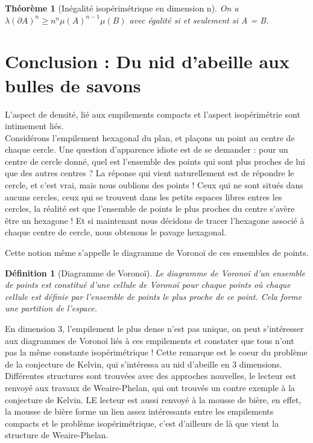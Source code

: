 \documentclass{book}
\newtheorem{theorem}{Théorème}
\newtheorem{definition}{Définition}
\begin{document}
\begin{tcolorbox}[colback=green!6]
\begin{theorem}[Inégalité isopérimétrique en dimension n]
On a $\lambda (\partial A)^n \geq n^n \mu (A)^{n-1} \mu (B)$ avec égalité si et seulement si A = B.
\end{theorem}
\end{tcolorbox}
\newpage

\section{Conclusion : Du nid d'abeille aux bulles de savons}

L'aspect de densité, lié aux empilements compacts et l'aspect isopérimétrie sont intimement liés. \\
Considérons l'empilement hexagonal du plan, et plaçons un point au centre de chaque cercle. Une question d'apparence idiote est de se demander : pour un centre de cercle donné, quel est l'ensemble des points qui sont plus proches de lui que des autres centres ? La réponse qui vient naturellement est de répondre le cercle, et c'est vrai, mais nous oublions des points ! Ceux qui ne sont situés dans aucuns cercles, ceux qui se trouvent dans les petits espaces libres entres les cercles, la réalité est que l'ensemble de points le plus proches du centre s'avère être un hexagone ! Et si maintenant nous décidons de tracer l'hexagone associé à chaque centre de cercle, nous obtenons le pavage hexagonal.

Cette notion même s'appelle le diagramme de Voronoï de ces ensembles de points.

\begin{definition}[Diagramme de Voronoï]

Le diagramme de Voronoï d'un ensemble de points est constitué d'une cellule de Voronoï pour chaque points où chaque cellule est définie par l'ensemble de points le plus proche de ce point. Cela forme une partition de l'espace.
\end{definition}

En dimension 3, l'empilement le plus dense n'est pas unique, on peut s'intéresser aux diagrammes de Voronoï liés à ces empilements et constater que tous n'ont pas la même constante isopérimétrique ! Cette remarque est le coeur du problème de la conjecture de Kelvin, qui s'intéressa au nid d'abeille en 3 dimensions. Différentes structures sont trouvées avec des approches nouvelles, le lecteur est renvoyé aux travaux de Weaire-Phelan, qui ont trouvés un contre exemple à la conjecture de Kelvin. LE lecteur est aussi renvoyé à la mousse de bière, en effet, la mousse de bière forme un lien assez intéressants entre les empilements compacts et le problème isopérimétrique, c'est d'ailleurs de là que vient la structure de Weaire-Phelan. 
\end{document}
